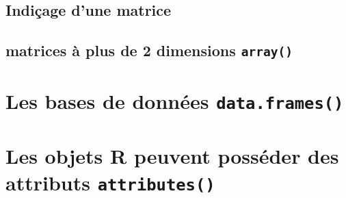 \documentclass[
]{book}
\begin{document}
\subsection{Indiçage d'une matrice}\label{indiuxe7age-dune-matrice}

\subsection{\texorpdfstring{matrices à plus de 2 dimensions \texttt{array()}}{matrices à plus de 2 dimensions array()}}\label{matrices-uxe0-plus-de-2-dimensions-array}

\section{\texorpdfstring{Les bases de données \texttt{data.frames()}}{Les bases de données data.frames()}}\label{les-bases-de-donnuxe9es-data.frames}

\section{\texorpdfstring{Les objets R peuvent posséder des attributs \texttt{attributes()}}{Les objets R peuvent posséder des attributs attributes()}}\label{les-objets-r-peuvent-possuxe9der-des-attributs-attributes}
\end{document}

